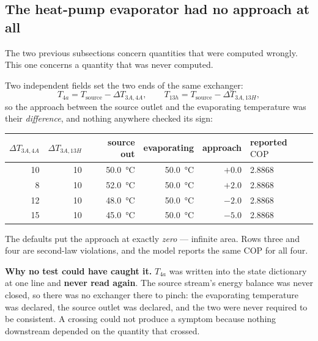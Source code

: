 \subsection{The heat-pump evaporator had no approach at all}
\label{sec:defects:hpe}

The two previous subsections concern quantities that were computed wrongly.
This one concerns a quantity that was never computed.

Two independent fields set the two ends of the same exchanger:
\begin{equation}
  T_{4a} = T_{\mathrm{source}} - \Delta T_{3A,4A},
  \qquad
  T_{13h} = T_{\mathrm{source}} - \Delta T_{3A,13H},
  \label{eq:hpe-old}
\end{equation}
so the approach between the source outlet and the evaporating temperature was
their \emph{difference}, and nothing anywhere checked its sign:

\begin{center}
\begin{tabular}{@{}r r r r r l@{}}
\toprule
$\Delta T_{3A,4A}$ & $\Delta T_{3A,13H}$ & source out & evaporating & approach
 & reported $\mathrm{COP}$ \\
\midrule
10 & 10 & \SI{50.0}{\celsius} & \SI{50.0}{\celsius} & $+0.0$ & 2.8868 \\
 8 & 10 & \SI{52.0}{\celsius} & \SI{50.0}{\celsius} & $+2.0$ & 2.8868 \\
12 & 10 & \SI{48.0}{\celsius} & \SI{50.0}{\celsius} & $\mathbf{-2.0}$ & 2.8868 \\
15 & 10 & \SI{45.0}{\celsius} & \SI{50.0}{\celsius} & $\mathbf{-5.0}$ & 2.8868 \\
\bottomrule
\end{tabular}
\end{center}

\noindent
The defaults put the approach at exactly \emph{zero} --- infinite area. Rows
three and four are second-law violations, and the model reports the same
$\mathrm{COP}$ for all four.

\medskip
\noindent\textbf{Why no test could have caught it.} $T_{4a}$ was written into
the state dictionary at one line and \textbf{never read again}. The source
stream's energy balance was never closed, so there was no exchanger there to
pinch: the evaporating temperature was declared, the source outlet was declared,
and the two were never required to be consistent. A crossing could not produce a
symptom because nothing downstream depended on the quantity that crossed.

